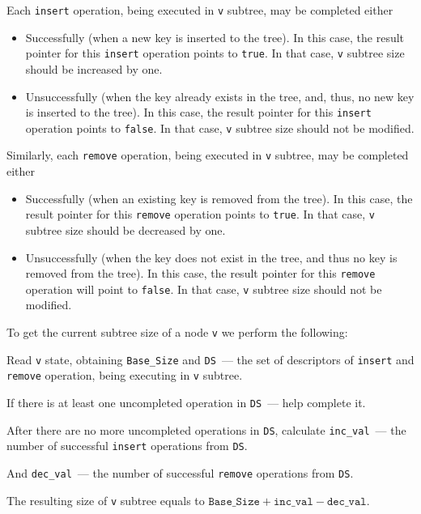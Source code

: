 \documentclass[times, dvipsnames,%
               languages={russian,english} %
              ]{itmo-student-thesis}
\begin{document}
Each \texttt{insert} operation, being executed in \texttt{v} subtree, may be completed either

\begin{itemize}
    \item Successfully (when a new key is inserted to the tree). In this case, the result pointer for this \texttt{insert} operation points to \texttt{true}. In that case, \texttt{v} subtree size should be increased by one.
    
    \item Unsuccessfully (when the key already exists in the tree, and, thus, no new key is inserted to the tree). In this case, the result pointer for this \texttt{insert} operation points to \texttt{false}. In that case, \texttt{v} subtree size should not be modified.
\end{itemize}

\bigbreak

Similarly, each \texttt{remove} operation, being executed in \texttt{v} subtree, may be completed either

\begin{itemize}
    \item Successfully (when an existing key is removed from the tree). In this  case, the result pointer for this \texttt{remove} operation points to \texttt{true}. In that case, \texttt{v} subtree size should be decreased by one.
    
    \item Unsuccessfully (when the key does not exist in the tree, and thus no key is removed from the tree). In this  case, the result pointer for this \texttt{remove} operation will point to \texttt{false}. In that case, \texttt{v} subtree size should not be modified.
\end{itemize}

\bigbreak

To get the current subtree size of a node \texttt{v} we perform the following:

\begin{nenum}
    \item Read \texttt{v} state, obtaining \texttt{Base\_Size} and \texttt{DS}~--- the set of descriptors of \texttt{insert} and \texttt{remove} operation, being executing in \texttt{v} subtree.
    
    \item If there is at least one uncompleted operation in \texttt{DS}~--- help complete it.
    
    \item After there are no more uncompleted operations in \texttt{DS}, calculate \texttt{inc\_val}~--- the number of successful \texttt{insert} operations from \texttt{DS}.
    
    \item And \texttt{dec\_val}~--- the number of successful \texttt{remove} operations from \texttt{DS}.
    
    \item The resulting size of \texttt{v} subtree equals to $\texttt{Base\_Size} + \texttt{inc\_val} - \texttt{dec\_val}$.
\end{nenum}
\end{document}
